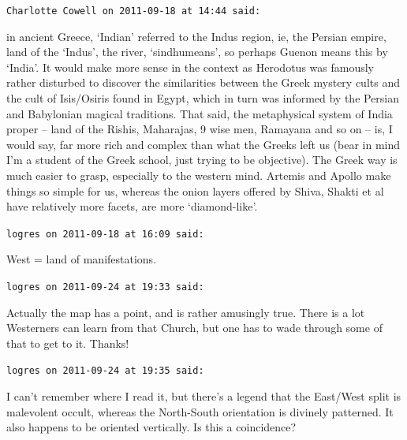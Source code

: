 \begin{footnotesize}
\begin{sffamily}
\hfill

\texttt{Charlotte Cowell on 2011-09-18 at 14:44 said:}

in ancient Greece, `Indian' referred to the Indus region, ie, the Persian empire, land of the `Indus', the river, `sindhumeans', so perhaps Guenon means this by `India'. It would make more sense in the context as Herodotus was famously rather disturbed to discover the similarities between the Greek mystery cults and the cult of Isis/Osiris found in Egypt, which in turn was informed by the Persian and Babylonian magical traditions. That said, the metaphysical system of India proper -- land of the Rishis, Maharajas, 9 wise men, Ramayana and so on -- is, I would say, far more rich and complex than what the Greeks left us (bear in mind I'm a student of the Greek school, just trying to be objective). The Greek way is much easier to grasp, especially to the western mind. Artemis and Apollo make things so simple for us, whereas the onion layers offered by Shiva, Shakti et al have relatively more facets, are more `diamond-like'.

\hfill

\texttt{logres on 2011-09-18 at 16:09 said:}

West = land of manifestations.

\hfill

\texttt{logres on 2011-09-24 at 19:33 said:}

Actually the map has a point, and is rather amusingly true. There is a lot Westerners can learn from that Church, but one has to wade through some of that to get to it. Thanks!

\hfill

\texttt{logres on 2011-09-24 at 19:35 said:}

I can't remember where I read it, but there's a legend that the East/West split is malevolent occult, whereas the North-South orientation is divinely patterned. It also happens to be oriented vertically. Is this a coincidence?


\hfill

\end{sffamily}
\end{footnotesize}

